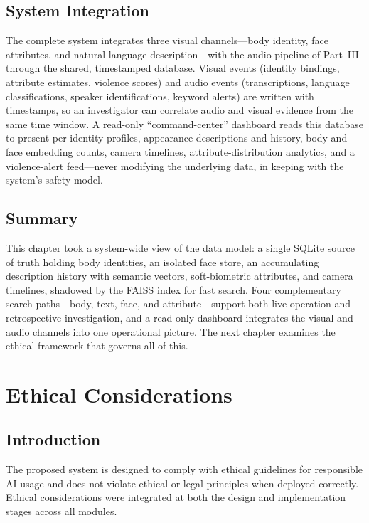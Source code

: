 \documentclass[12pt]{report}
\begin{document}
\section{System Integration}
The complete system integrates three visual channels---body identity, face attributes, and natural-language description---with the audio pipeline of Part~III through the shared, timestamped database. Visual events (identity bindings, attribute estimates, violence scores) and audio events (transcriptions, language classifications, speaker identifications, keyword alerts) are written with timestamps, so an investigator can correlate audio and visual evidence from the same time window. A read-only ``command-center'' dashboard reads this database to present per-identity profiles, appearance descriptions and history, body and face embedding counts, camera timelines, attribute-distribution analytics, and a violence-alert feed---never modifying the underlying data, in keeping with the system's safety model.

\section{Summary}
This chapter took a system-wide view of the data model: a single SQLite source of truth holding body identities, an isolated face store, an accumulating description history with semantic vectors, soft-biometric attributes, and camera timelines, shadowed by the FAISS index for fast search. Four complementary search paths---body, text, face, and attribute---support both live operation and retrospective investigation, and a read-only dashboard integrates the visual and audio channels into one operational picture. The next chapter examines the ethical framework that governs all of this.

\newpage

\chapter{Ethical Considerations}
\setcounter{section}{0}

\section{Introduction}
The proposed system is designed to comply with ethical guidelines for responsible AI usage and does not violate ethical or legal principles when deployed correctly. Ethical considerations were integrated at both the design and implementation stages across all modules.
\end{document}
